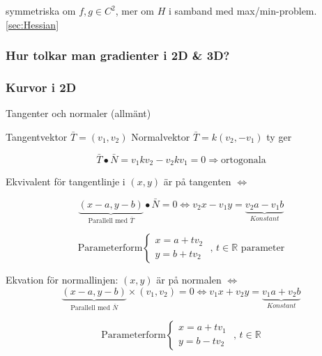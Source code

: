 \documentclass{article}
\begin{document}
symmetriska om \(f,g \in C^2\), \newline mer om \(H\) i samband med max/min-problem. \vref{sec:Hessian}

\subsubsection{Hur tolkar man gradienter i 2D \& 3D?}

\subsubsection*{Kurvor i 2D}

Tangenter och normaler (allmänt)

Tangentvektor \(\bar{T} = (v_1,v_2)\) \newline
Normalvektor \(\bar{T} = k(v_2,-v_1)\) ty ger \newline

\[\bar{T} \bullet \bar{N} = v_1kv_2 - v_2kv_1 = 0 \Rightarrow \text{ortogonala}\]

Ekvivalent för tangentlinje i \((x,y)\) är på tangenten \(\iff\) \newline

\[\underbrace{(x-a,y-b)}_{\text{Parallell med }\bar{T}} \bullet \bar{N} = 0 \iff v_2x - v_1y = \underbrace{v_2a - v_1b}_{Konstant}\]

\[
	\text{Parameterform} 
	\left\{\begin{array}{rcl}
		x=a+tv_2 \\
		y=b+tv_2
	\end{array}\right.
	\text{ , } t \in \mathbb{R} \text{ parameter}
\]

Ekvation för normallinjen: \((x,y)\) är på normalen \(\iff\)
\[
	\underbrace{(x-a,y-b)}_{\text{Parallell med }\bar{N}} \times (v_1,v_2) = 0 \iff v_1x + v_2y = \underbrace{v_1a + v_2b}_{Konstant}
\]

\[
	\text{Parameterform} 
	\left\{\begin{array}{rcl}
		x=a+tv_1 \\
		y=b-tv_2
	\end{array}\right.
	\text{ , } t \in \mathbb{R}
\]
\end{document}
